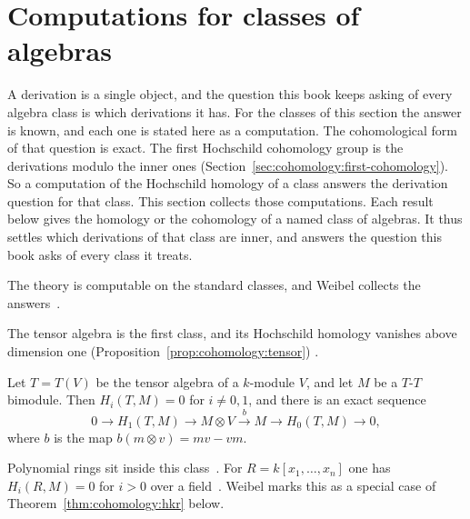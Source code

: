 \section{Computations for classes of algebras}\label{sec:cohomology:computations}

A derivation is a single object, and the question this book keeps asking of
every algebra class is which derivations it has. For the classes of this
section the answer is known, and each one is stated here as a computation. The cohomological form of that
question is exact. The first Hochschild cohomology group is the derivations
modulo the inner ones (Section~\ref{sec:cohomology:first-cohomology}). So a
computation of the Hochschild homology of a class answers the derivation
question for that class. This section collects those computations. Each result
below gives the homology or the cohomology of a named class of algebras. It thus
settles which derivations of that class are inner, and answers the question
this book asks of every class it treats.

The theory is computable on the standard classes, and Weibel collects the
answers~\cite[\S 9]{Weibel1994}.

The tensor algebra is the first class, and its Hochschild homology vanishes
above dimension one (Proposition~\ref{prop:cohomology:tensor})
\cite[Proposition~9.1.6, pp.~303--304]{Weibel1994}.\begin{proposition}\label{prop:cohomology:tensor}
Let $T = T(V)$ be the tensor algebra of a $k$-module $V$, and let $M$ be a
$T$-$T$ bimodule. Then $H_i(T, M) = 0$ for $i \neq 0, 1$, and there is an exact
sequence
\[
0 \longrightarrow H_1(T, M) \longrightarrow M \otimes V \xrightarrow{\;b\;} M
\longrightarrow H_0(T, M) \longrightarrow 0,
\]
where $b$ is the map $b(m \otimes v) = mv - vm$.
\end{proposition}

Polynomial rings sit inside this class~\cite[Exercise~9.1.3,
p.~304]{Weibel1994}. For $R = k[x_1, \dots, x_n]$ one has $H_i(R, M) = 0$ for
$i > 0$ over a field~\cite[Exercise~9.1.3, p.~304]{Weibel1994}. Weibel marks
this as a special case of Theorem~\ref{thm:cohomology:hkr} below.

